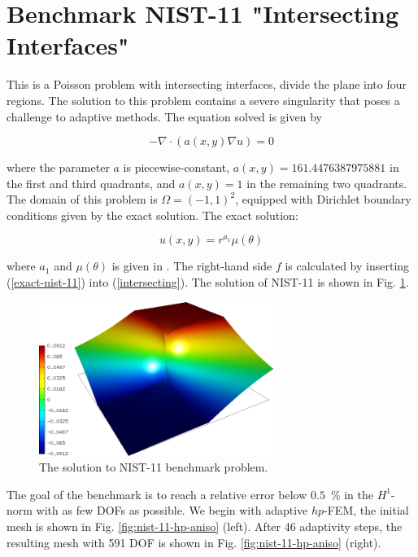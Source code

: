 \section{Benchmark NIST-11 "Intersecting Interfaces"}
\label{sec:bench-11}

This is a Poisson problem with intersecting interfaces, 
divide the plane into four regions. 
The solution to this problem contains a severe
singularity that poses a challenge to adaptive methods.
The equation solved is given by 

\begin{equation} \label{intersecting}
-\nabla \cdot (a(x,y) \nabla u) = 0
\end{equation}

where the parameter $a$ is piecewise-constant,
$a(x,y) = 161.4476387975881$ in the first and third quadrants,
and $a(x,y) = 1$ in the remaining two quadrants.
The domain of this problem is $\Omega = (-1, 1)^2$, equipped with
Dirichlet boundary conditions given by the exact solution.
The exact solution:

\begin{equation}\label{exact-nist-11}
u(x,y) = r^{a_1} \mu (\theta)
\end{equation}

where $a_1$ and $\mu (\theta)$ is given in \cite{mitchell-1}.
The right-hand side $f$ is calculated by inserting
(\ref{exact-nist-11}) into (\ref{intersecting}).
The solution of NIST-11 is shown in Fig. \ref{fig:sln-nist11}.

\begin{figure}[!ht]
\centering
\includegraphics[height=5cm]{nist/nist-11/solution.png}
\caption{The solution to NIST-11 benchmark problem.}
\label{fig:sln-nist11}
\end{figure}

The goal of the benchmark is to reach a relative error below
$0.5$~\% in the $H^1$-norm with as few DOFs as possible.
We begin with adaptive $hp$-FEM,
the initial mesh is shown in Fig. \ref{fig:nist-11-hp-aniso} (left).
After 46 adaptivity steps, the resulting mesh with 591 DOF is shown
in Fig. \ref{fig:nist-11-hp-aniso} (right).

